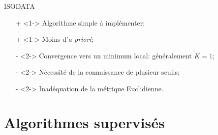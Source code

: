 \documentclass[8pt]{beamer}
\begin{document}
			\begin{frame}{ISODATA}
				\begin{itemize}
					\item[\color{green}+]<1-> Algorithme simple à implémenter;
					\item[\color{green}+]<1-> Moins d'\textit{a priori};
					\item[\color{red}-]<2-> Convergence vers un minimum local: généralement \(K = 1\);
					\item[\color{red}-]<2-> Nécessité de la connaissance de plusieur seuils;
					\item[\color{red}-]<2-> Inadéquation de la métrique Euclidienne.
				\end{itemize}
			\end{frame}

	\section{Algorithmes supervisés}
\end{document}
